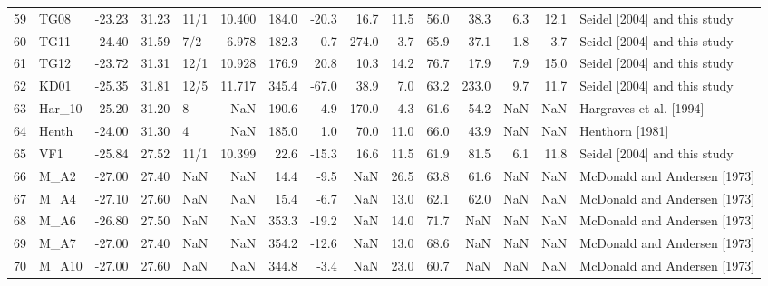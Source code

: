 \documentclass{article}
\begin{document}
{\begin{tabular}{llrrlrrrrrrrrrl}
59 &              TG08 &        -23.23 &          31.23 &   11/1 &  10.400 &  184.0 & -20.3 &   16.7 &  11.5 &  56.0 &   38.3 &   6.3 &  12.1 &   Seidel [2004] and this study \\
60 &              TG11 &        -24.40 &          31.59 &    7/2 &   6.978 &  182.3 &   0.7 &  274.0 &   3.7 &  65.9 &   37.1 &   1.8 &   3.7 &   Seidel [2004] and this study \\
61 &              TG12 &        -23.72 &          31.31 &   12/1 &  10.928 &  176.9 &  20.8 &   10.3 &  14.2 &  76.7 &   17.9 &   7.9 &  15.0 &   Seidel [2004] and this study \\
62 &              KD01 &        -25.35 &          31.81 &   12/5 &  11.717 &  345.4 & -67.0 &   38.9 &   7.0 &  63.2 &  233.0 &   9.7 &  11.7 &   Seidel [2004] and this study \\
63 &            Har\_10 &        -25.20 &          31.20 &      8 &     NaN &  190.6 &  -4.9 &  170.0 &   4.3 &  61.6 &   54.2 &   NaN &   NaN &        Hargraves et al. [1994] \\
64 &             Henth &        -24.00 &          31.30 &      4 &     NaN &  185.0 &   1.0 &   70.0 &  11.0 &  66.0 &   43.9 &   NaN &   NaN &                Henthorn [1981] \\
65 &               VF1 &        -25.84 &          27.52 &   11/1 &  10.399 &   22.6 & -15.3 &   16.6 &  11.5 &  61.9 &   81.5 &   6.1 &  11.8 &   Seidel [2004] and this study \\
66 &              M\_A2 &        -27.00 &          27.40 &    NaN &     NaN &   14.4 &  -9.5 &    NaN &  26.5 &  63.8 &   61.6 &   NaN &   NaN &   McDonald and Andersen [1973] \\
67 &              M\_A4 &        -27.10 &          27.60 &    NaN &     NaN &   15.4 &  -6.7 &    NaN &  13.0 &  62.1 &   62.0 &   NaN &   NaN &   McDonald and Andersen [1973] \\
68 &              M\_A6 &        -26.80 &          27.50 &    NaN &     NaN &  353.3 & -19.2 &    NaN &  14.0 &  71.7 &    NaN &   NaN &   NaN &   McDonald and Andersen [1973] \\
69 &              M\_A7 &        -27.00 &          27.40 &    NaN &     NaN &  354.2 & -12.6 &    NaN &  13.0 &  68.6 &    NaN &   NaN &   NaN &   McDonald and Andersen [1973] \\
70 &             M\_A10 &        -27.00 &          27.60 &    NaN &     NaN &  344.8 &  -3.4 &    NaN &  23.0 &  60.7 &    NaN &   NaN &   NaN &   McDonald and Andersen [1973] \\

\end{tabular}}
\end{document}
